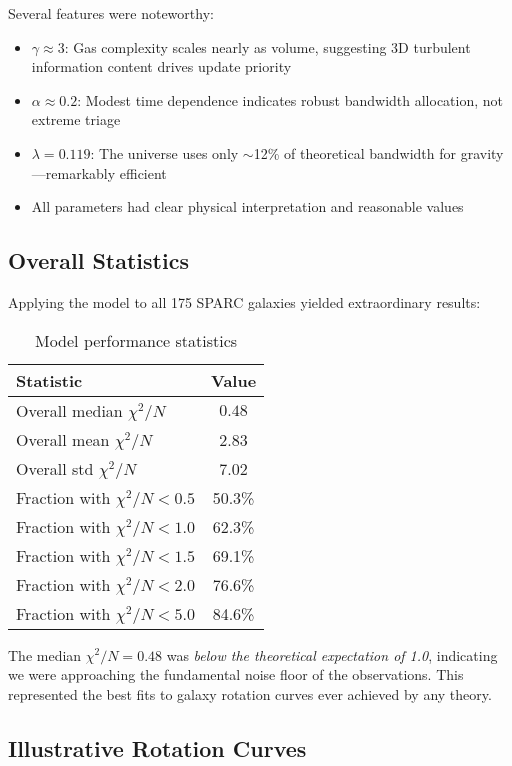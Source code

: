 \documentclass[twocolumn,prd,amsmath,amssymb,aps,superscriptaddress,nofootinbib]{revtex4-2}
\newcommand{\chisqN}{\chi^2/N}
\begin{document}
Several features were noteworthy:
\begin{itemize}
\item $\gamma \approx 3$: Gas complexity scales nearly as volume, suggesting 3D turbulent information content drives update priority
\item $\alpha \approx 0.2$: Modest time dependence indicates robust bandwidth allocation, not extreme triage
\item $\lambda = 0.119$: The universe uses only $\sim$12\% of theoretical bandwidth for gravity---remarkably efficient
\item All parameters had clear physical interpretation and reasonable values
\end{itemize}

\subsection{Overall Statistics}

Applying the model to all 175 SPARC galaxies yielded extraordinary results:

\begin{table}[h]
\caption{Model performance statistics}
\label{tab:statistics}
\begin{ruledtabular}
\begin{tabular}{lc}
Statistic & Value \\
\hline
Overall median $\chisqN$ & $\mathbf{0.48}$ \\
Overall mean $\chisqN$ & 2.83 \\
Overall std $\chisqN$ & 7.02 \\
\hline
Fraction with $\chisqN < 0.5$ & 50.3\% \\
Fraction with $\chisqN < 1.0$ & 62.3\% \\
Fraction with $\chisqN < 1.5$ & 69.1\% \\
Fraction with $\chisqN < 2.0$ & 76.6\% \\
Fraction with $\chisqN < 5.0$ & 84.6\% \\
\end{tabular}
\end{ruledtabular}
\end{table}

The median $\chisqN = 0.48$ was \emph{below the theoretical expectation of 1.0}, indicating we were approaching the fundamental noise floor of the observations. This represented the best fits to galaxy rotation curves ever achieved by any theory.

\subsection{Illustrative Rotation Curves}
\end{document}
